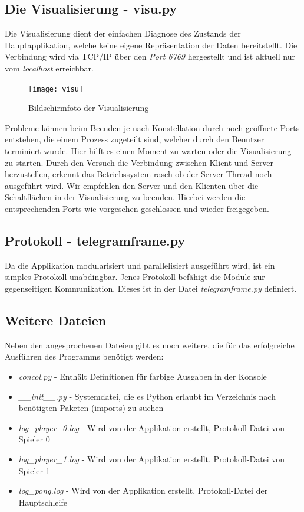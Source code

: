 \documentclass[12pt,twoside]{article}
\theoremstyle{plain}
\theoremstyle{definition}
\theoremstyle{remark}
\begin{document}
\subsection{Die Visualisierung - visu.py}
\label{visu.py}

Die Visualisierung dient der einfachen Diagnose des Zustands der Hauptapplikation, welche keine eigene Repräsentation der Daten bereitstellt. Die Verbindung wird via TCP/IP über den \textit{Port 6769} hergestellt und ist aktuell nur vom \textit{localhost} erreichbar.

\begin{figure}[hbtp]
	 \centerline{\texttt{[image: visu]}}
	 {\caption{Bildschirmfoto der Visualisierung}\label{fig:visu}}
\end{figure}

Probleme können beim Beenden je nach Konstellation durch noch geöffnete Ports entstehen, die einem Prozess zugeteilt sind, welcher durch den Benutzer terminiert wurde. 
Hier hilft es einen Moment zu warten oder die Visualisierung zu starten. 
Durch den Versuch die Verbindung zwischen Klient und Server herzustellen, erkennt das Betriebssystem rasch ob der Server-Thread noch ausgeführt wird.
Wir empfehlen den Server und den Klienten über die Schaltflächen in der Visualisierung zu beenden. Hierbei werden die entsprechenden Ports wie vorgesehen geschlossen und wieder freigegeben.


\subsection{Protokoll - telegramframe.py}
\label{telegramframe.py}

Da die Applikation modularisiert und parallelisiert ausgeführt wird, ist ein simples Protokoll unabdingbar. Jenes Protokoll befähigt die Module zur gegenseitigen Kommunikation. Dieses ist in der Datei \textit{telegramframe.py} definiert. 


\subsection{Weitere Dateien}
\label{otherfiles}


Neben den angesprochenen Dateien gibt es noch weitere, die für das erfolgreiche Ausführen des Programms benötigt werden:

\begin{itemize}
  \item \textit{concol.py} \tabto{4cm}- Enthält Definitionen für farbige Ausgaben in der \tabto{5cm} Konsole
  \item \textit{\_\_init\_\_.py} \tabto{4cm}- Systemdatei, die es Python erlaubt im Verzeichnis \tabto{5cm} nach benötigten Paketen (imports) zu suchen 
  \item \textit{log\_player\_0.log} \tabto{4cm}- Wird von der Applikation erstellt, Protokoll-Datei \tabto{5cm} von Spieler 0 
  \item \textit{log\_player\_1.log} \tabto{4cm}- Wird von der Applikation erstellt, Protokoll-Datei \tabto{5cm} von Spieler 1 
  \item \textit{log\_pong.log} \tabto{4cm}- Wird von der Applikation erstellt, Protokoll-Datei \tabto{5cm}der Hauptschleife 
\end{itemize}
\end{document}
